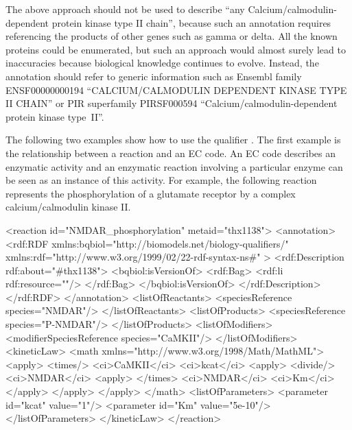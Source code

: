 The above approach should not be used to describe ``any
Calcium/calmodulin-dependent protein kinase type II chain'',
because such an annotation requires referencing the products of
other genes such as gamma or delta. All the known proteins could
be enumerated, but such an approach would almost surely lead to
inaccuracies because biological knowledge continues to evolve.
Instead, the annotation should refer to generic information such
as Ensembl family ENSF00000000194 ``CALCIUM/CALMODULIN DEPENDENT
KINASE TYPE II CHAIN'' or PIR superfamily PIRSF000594
``Calcium/calmodulin-dependent protein kinase type~II''.


The following two examples show how to use the qualifier
. The first example is the relationship
between a reaction and an EC code. An EC code describes an
enzymatic activity and an enzymatic reaction involving a
particular enzyme can be seen as an instance of this activity. For
example, the following reaction represents the phosphorylation of
a glutamate receptor by a complex calcium/calmodulin kinase II.

\begin{example}
<reaction id="NMDAR_phosphorylation" metaid="thx1138">
  <annotation>
    <rdf:RDF
      xmlns:bqbiol="http://biomodels.net/biology-qualifiers/"
      xmlns:rdf="http://www.w3.org/1999/02/22-rdf-syntax-ns\#"
    >
      <rdf:Description rdf:about="#thx1138">
        <bqbiol:isVersionOf>
          <rdf:Bag>
            <rdf:li rdf:resource="\!"/>
          </rdf:Bag>
        </bqbiol:isVersionOf>
      </rdf:Description>
    </rdf:RDF>
  </annotation>
  <listOfReactants>
    <speciesReference species="NMDAR"/>
  </listOfReactants>
  <listOfProducts>
    <speciesReference species="P-NMDAR"/>
  </listOfProducts>
  <listOfModifiers>
    <modifierSpeciesReference species="CaMKII"/>
  </listOfModifiers>
  <kineticLaw>
    <math xmlns="http://www.w3.org/1998/Math/MathML">
      <apply>
        <times/>
        <ci>CaMKII</ci>
        <ci>kcat</ci>
        <apply>
          <divide/>
          <ci>NMDAR</ci>
          <apply>
            </times>
            <ci>NMDAR</ci>
            <ci>Km</ci>
          </apply>
        </apply>
      </apply>
    </math>
    <listOfParameters>
      <parameter id="kcat" value="1"/>
      <parameter id="Km" value="5e-10"/>
    </listOfParameters>
  </kineticLaw>
</reaction>
\end{example}

